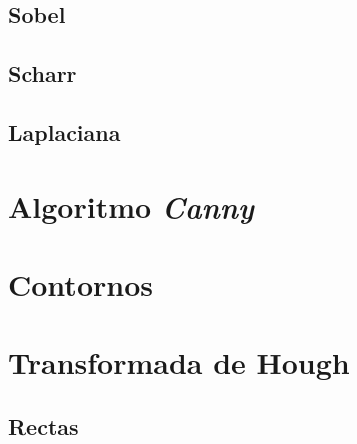 \subsection{Sobel}
\subsection{Scharr}
\subsection{Laplaciana}

\section{Algoritmo \emph{Canny}}

\section{Contornos}

\section{Transformada de Hough}
\subsection{Rectas}